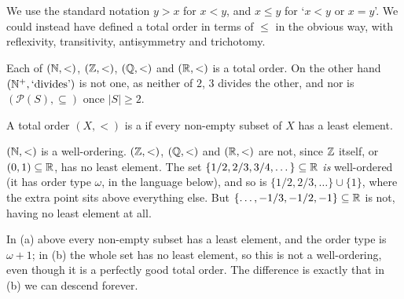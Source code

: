 \documentclass[a4paper]{scrartcl}
\begin{document}
We use the standard notation $y > x$ for $x < y$, and $x \leq y$ for `$x < y$ or $x = y$'. We could instead have defined a total order in terms of $\leq$ in the obvious way, with reflexivity, transitivity, antisymmetry and trichotomy.

\begin{example}
  Each of $(\mathbb{N}, <)$, $(\mathbb{Z}, <)$, $(\mathbb{Q}, <)$ and $(\mathbb{R}, <)$ is a total order. On the other hand $(\mathbb{N}^+, \text{`divides'})$ is not one, as neither of $2$, $3$ divides the other, and nor is $(\mathcal{P}(S), \subseteq)$ once $|S| \geq 2$.
\end{example}

\begin{definition}
  A total order $(X, <)$ is a  if every non-empty subset of $X$ has a least element.
\end{definition}

\begin{example}
  $(\mathbb{N}, <)$ is a well-ordering. $(\mathbb{Z}, <)$, $(\mathbb{Q}, <)$ and $(\mathbb{R}, <)$ are not, since $\mathbb{Z}$ itself, or $(0,1) \subseteq \mathbb{R}$, has no least element. The set $\{1/2, 2/3, 3/4, \dots\} \subseteq \mathbb{R}$ \emph{is} well-ordered (it has order type $\omega$, in the language below), and so is $\{1/2, 2/3, \dots\} \cup \{1\}$, where the extra point sits above everything else. But $\{\dots, -1/3, -1/2, -1\} \subseteq \mathbb{R}$ is not, having no least element at all.
\end{example}

\begin{center}
\end{center}

In (a) above every non-empty subset has a least element, and the order type is $\omega + 1$; in (b) the whole set has no least element, so this is not a well-ordering, even though it is a perfectly good total order. The difference is exactly that in (b) we can descend forever.
\end{document}
